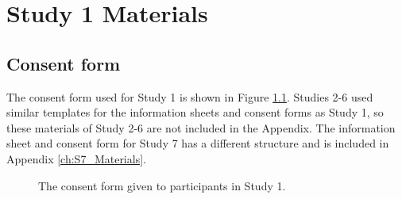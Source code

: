 \chapter{Study 1 Materials}
\section{Consent form}\label{ch:consentform}
The consent form used for Study 1 is shown in Figure \ref{fig:consentform}. Studies 2-6 used similar templates for the information sheets and consent forms as Study 1, so these materials of Study 2-6 are not included in the Appendix. The information sheet and consent form for Study 7 has a different structure and is included in Appendix \ref{ch:S7_Materials}.

\begin{figure}[htp] 
\caption[Study 1 consent form]{The consent form given to participants in Study 1.}
\label{fig:consentform}
\end{figure} 

